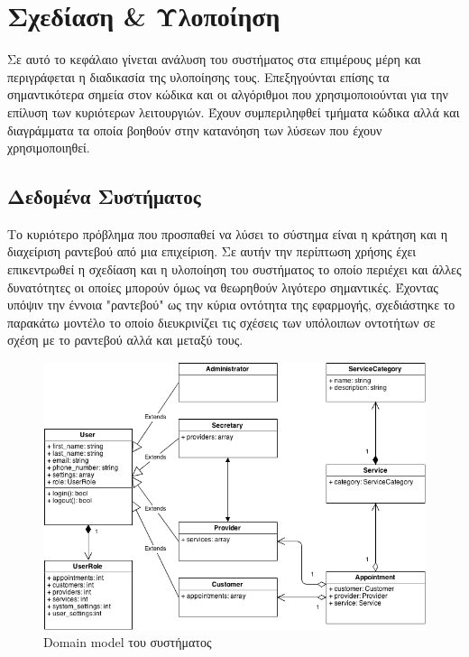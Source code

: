 \chapter{Σχεδίαση \& Υλοποίηση}
Σε αυτό το κεφάλαιο γίνεται ανάλυση του συστήματος στα επιμέρους μέρη και περιγράφεται η διαδικασία της υλοποίησης τους. Επεξηγούνται επίσης τα σημαντικότερα σημεία στον κώδικα και οι αλγόριθμοι που χρησιμοποιούνται για την επίλυση των κυριότερων λειτουργιών. Έχουν συμπεριληφθεί τμήματα κώδικα αλλά και διαγράμματα τα οποία βοηθούν στην κατανόηση των λύσεων που έχουν χρησιμοποιηθεί.

\section{Δεδομένα Συστήματος}
Το κυριότερο πρόβλημα που προσπαθεί να λύσει το σύστημα είναι η κράτηση και η διαχείριση ραντεβού από μια επιχείριση. Σε αυτήν την περίπτωση χρήσης έχει επικεντρωθεί η σχεδίαση και η υλοποίηση του συστήματος το οποίο περιέχει και άλλες δυνατότητες οι οποίες μπορούν όμως να θεωρηθούν λιγότερο σημαντικές. Έχοντας υπόψιν την έννοια "ραντεβού" ως την κύρια οντότητα της εφαρμογής, σχεδιάστηκε το παρακάτω μοντέλο το οποίο διευκρινίζει τις σχέσεις των υπόλοιπων οντοτήτων σε σχέση με το ραντεβού αλλά και μεταξύ τους.

\begin{figure}[ht!]
\centering
\includegraphics[width=160mm]{images/domain-model.png}
\caption{Domain model του συστήματος}
\label{domain-model}
\end{figure}

